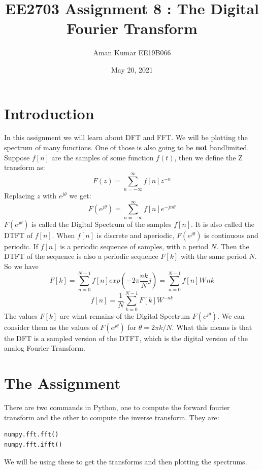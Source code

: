 \documentclass[11pt, a4paper]{article}
\title{EE2703 Assignment 8 : The Digital Fourier Transform}
\author{Aman Kumar EE19B066}
\date{May 20, 2021}
\begin{document}
\maketitle

\section{Introduction}
In this assignment we will learn about DFT and FFT. We will be plotting the spectrum of many functions. One of those is also going to be \textbf{not} bandlimited. Suppose $f[n]$ are the samples of some function $f(t)$, then we define the Z transform as:
\begin{equation*}
    F(z) = \sum_{n = -\infty}^{\infty}f[n]z^{-n}
\end{equation*}
Replacing $z$ with $e^{j\theta}$ we get:
\begin{equation*}
    F(e^{j\theta}) = \sum_{n = -\infty}^{\infty}f[n]e^{-jn\theta}
\end{equation*}
$F(e^{j\theta})$ is called the Digital Spectrum of the samples $f[n]$. It is also called the DTFT of $f[n]$. When $f[n]$ is discrete and aperiodic, $F(e^{j\theta})$ is continuous and periodic. If $f[n]$ is a periodic sequence of samples, with a period $N$. Then the DTFT of the sequence is also a periodic sequence $F[k]$ with the same period $N$. So we have
\begin{equation}
    F[k] = \sum_{n=0}^{N-1}f[n]exp(-2\pi \frac{nk}{N} j) = \sum_{n=0}^{N-1}f[n]W^{}nk
\end{equation}
\begin{equation}
    f[n] = \frac{1}{N}\sum_{k=0}^{N-1}F[k]W^{-nk}
\end{equation}
The values $F[k]$ are what remains of the Digital Spectrum $F(e^{j\theta})$. We can consider them as the values of $F(e^{j\theta})$ for $\theta = 2\pi k/N$. What this means is that the DFT is a sampled version of the DTFT, which is the
digital version of the analog Fourier Transform.
\section{The Assignment}
There are two commands in Python, one to compute the forward fourier transform and the other to compute the inverse transform. They are:
\begin{verbatim}
numpy.fft.fft()
numpy.fft.ifft()
\end{verbatim}
We will be using these to get the transforms and then plotting the spectrums.
\end{document}
